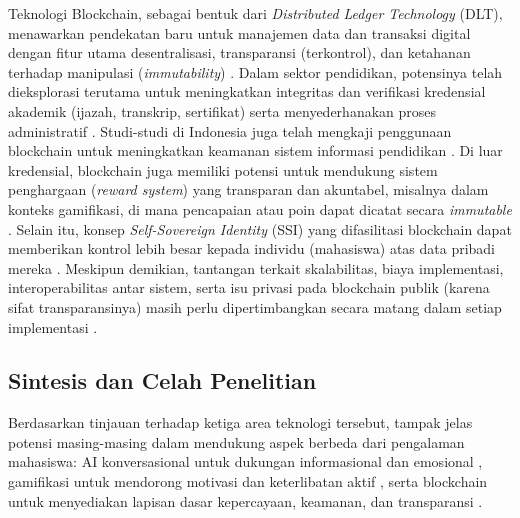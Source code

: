 \noindent Teknologi Blockchain, sebagai bentuk dari \textit{Distributed Ledger Technology} (DLT), menawarkan pendekatan baru untuk manajemen data dan transaksi digital dengan fitur utama desentralisasi, transparansi (terkontrol), dan ketahanan terhadap manipulasi (\textit{immutability}) \cite{blockchain_security_privacy_education_2020}. Dalam sektor pendidikan, potensinya telah dieksplorasi terutama untuk meningkatkan integritas dan verifikasi kredensial akademik (ijazah, transkrip, sertifikat) serta menyederhanakan proses administratif \cite{blockchain_education_transforming_2024}. Studi-studi di Indonesia juga telah mengkaji penggunaan blockchain untuk meningkatkan keamanan sistem informasi pendidikan \cite{blockchain_security_education_rizky_2021}. Di luar kredensial, blockchain juga memiliki potensi untuk mendukung sistem penghargaan (\textit{reward system}) yang transparan dan akuntabel, misalnya dalam konteks gamifikasi, di mana pencapaian atau poin dapat dicatat secara \textit{immutable} \cite{integrated_metaverse_blockchain_ai_education_2025}. Selain itu, konsep \textit{Self-Sovereign Identity} (SSI) yang difasilitasi blockchain dapat memberikan kontrol lebih besar kepada individu (mahasiswa) atas data pribadi mereka \cite{survey_blockchain_privacy_2024}. Meskipun demikian, tantangan terkait skalabilitas, biaya implementasi, interoperabilitas antar sistem, serta isu privasi pada blockchain publik (karena sifat transparansinya) masih perlu dipertimbangkan secara matang dalam setiap implementasi \cite{survey_blockchain_privacy_2024, blockchain_security_privacy_education_2020}.

\subsection{Sintesis dan Celah Penelitian}
\label{subsec:sintesis_celah}

\noindent Berdasarkan tinjauan terhadap ketiga area teknologi tersebut, tampak jelas potensi masing-masing dalam mendukung aspek berbeda dari pengalaman mahasiswa: AI konversasional untuk dukungan informasional dan emosional \cite{empathetic_conversational_agents_mental_health_2024, chatbot_student_mental_health_unuja}, gamifikasi untuk mendorong motivasi dan keterlibatan aktif \cite{gamification_higher_ed_review_2023, gamification_engagement_moderating_concentration_2024}, serta blockchain untuk menyediakan lapisan dasar kepercayaan, keamanan, dan transparansi \cite{blockchain_education_transforming_2024, blockchain_security_privacy_education_2020}.

